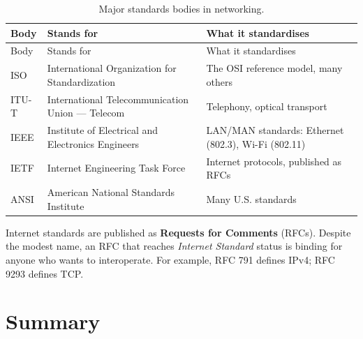 \documentclass[
  letterpaper,
  DIV=11,
  numbers=noendperiod]{scrreprt}
\begin{document}
\begin{longtable}[]{@{}
  >{\raggedright\arraybackslash}p{}
  >{\raggedright\arraybackslash}p{}
  >{\raggedright\arraybackslash}p{}@{}}
\caption{Major standards bodies in
networking.}\label{tbl-standards}\tabularnewline
\toprule\noalign{}
\begin{minipage}[b]{\linewidth}\raggedright
Body
\end{minipage} & \begin{minipage}[b]{\linewidth}\raggedright
Stands for
\end{minipage} & \begin{minipage}[b]{\linewidth}\raggedright
What it standardises
\end{minipage} \\
\midrule\noalign{}
\endfirsthead
\toprule\noalign{}
\begin{minipage}[b]{\linewidth}\raggedright
Body
\end{minipage} & \begin{minipage}[b]{\linewidth}\raggedright
Stands for
\end{minipage} & \begin{minipage}[b]{\linewidth}\raggedright
What it standardises
\end{minipage} \\
\midrule\noalign{}
\endhead
\bottomrule\noalign{}
\endlastfoot
ISO & International Organization for Standardization & The OSI reference
model, many others \\
ITU-T & International Telecommunication Union --- Telecom & Telephony,
optical transport \\
IEEE & Institute of Electrical and Electronics Engineers & LAN/MAN
standards: Ethernet (802.3), Wi-Fi (802.11) \\
IETF & Internet Engineering Task Force & Internet protocols, published
as RFCs \\
ANSI & American National Standards Institute & Many U.S. standards \\
\end{longtable}

Internet standards are published as \textbf{Requests for Comments}
(RFCs). Despite the modest name, an RFC that reaches \emph{Internet
Standard} status is binding for anyone who wants to interoperate. For
example, RFC 791 defines IPv4; RFC 9293 defines TCP.

\section{Summary}\label{summary}
\end{document}

